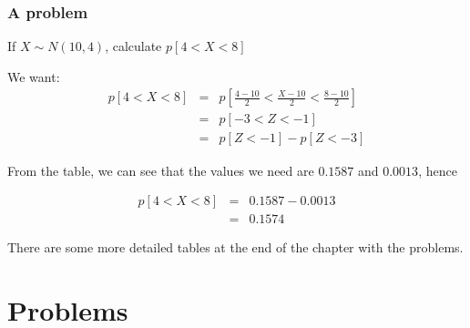 \documentclass[12pt]{extbook}
\begin{document}
\newpage
\subsubsection{A problem}

If $X \sim N(10,4)$, calculate $p[4 < X < 8]$

We want:
\begin{eqnarray*}
p[4 < X < 8] &=& p \left[ \frac{4-10}{2} < \frac{X-10}{2} < \frac{8-10}{2} \right]\\
&=& p[-3 < Z < -1]\\
&=& p[Z < -1] - p[Z < -3]
\end{eqnarray*}

From the table, we can see that the values we need are $0.1587$ and $0.0013$, hence

\begin{eqnarray*}
p[4 < X < 8] &=& 0.1587-0.0013\\
 &=& 0.1574
\end{eqnarray*}

There are some more detailed tables at the end of the chapter with the problems.

\section{Problems}

\begin{enumerate}

















\end{enumerate}
\end{document}
